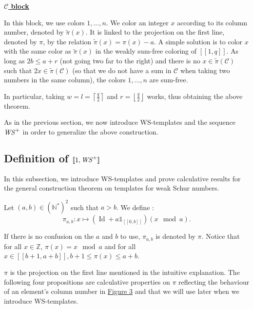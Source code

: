 \noindent \underline{\textbf{\(\mathcal{C}\) block}}
\par
In this block,  we use colors \(1, ..., n\). We color an integer \(x\) according to its column number, denoted by \(\tilde{\pi}(x)\). It is linked to the
projection on the first line, denoted by \(\pi\), by the relation \(\tilde{\pi}(x) = \pi(x) - a\). A simple solution is to color \(x\) with the same color
as \(\tilde{\pi}(x)\) in the weakly sum-free coloring of \([\![1,q]\!]\). As long as \(2b \leqslant a + r\) (not going two far to the right) and there
is no \(x \in \tilde{\pi}(\mathcal{C})\) such that \(2x \in \tilde{\pi}(\mathcal{C})\) (so that we do not have a sum in \(\mathcal{C}\) when
taking two numbers in the same column), the colors \(1, ..., n\) are sum-free.

In particular, taking \(w = l = \left\lceil \displaystyle \frac{q}{2} \right\rceil\) and \(r = \left\lfloor \displaystyle \frac{q}{2} \right\rfloor\) works, thus obtaining the above theorem.\\
\par
As in the previous section, we now introduce WS-templates and the sequence \(\mathit{WS}^+\) in order to generalize the above construction.

\subsection{Definition of \([\![ 1, \mathit{WS}^+ ]\!]\)}
\label{DefinitionWS+}

In this subsection, we introduce WS-templates and prove calculative results for the general construction
theorem on templates for weak Schur numbers.

\begin{definition}
Let \((a,b) \in (\mathbb{N}^*)^2\) such that \(a>b\). We define :
\[ \pi_{a,b}:x \longmapsto (\operatorname{Id}+a\mathds{1}_{ [\![0,b]\!]})(x \mod a).\]
\end{definition}

\begin{sloppypar}
If there is no confusion on the \(a\) and \(b\) to use, \(\pi_{a, b}\) is denoted by \(\pi\). Notice that for all \(x \in \mathbb{Z}\), 
\({\pi(x) = x \mod a}\) and for all \(x \in [\![b + 1, a + b]\!], b + 1 \leqslant \pi(x) \leqslant a + b\).
\end{sloppypar}

\begin{sloppypar}
\(\pi\) is the projection on the first line mentioned in the intuitive explanation. The following four propositions are
calculative properties on \(\pi\) reflecting the behaviour of an element's column number in \hyperref[SchemaWS]{Figure 3} and
that we will use later when we introduce WS-templates.
\end{sloppypar}

